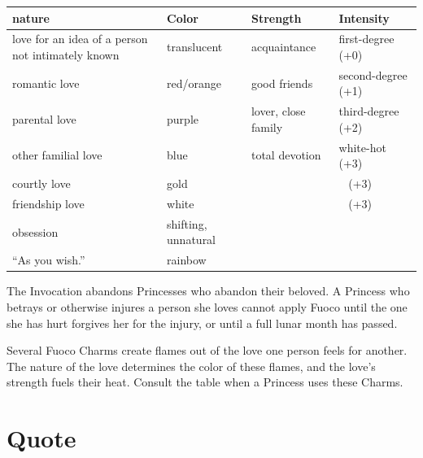 \begin{multicols}{2}
	\bigsidebarstart
	
    \centering \begin{tabulary}{1\textwidth}{|L|L|L|L|}
        \hline
        nature                                               & Color                & Strength             & Intensity        \\ \hline
        love for an idea of a person not intimately known  & translucent          & acquaintance         & first-degree (+0)  \\ \hline
        romantic love                                        & red/orange           & good friends         & second-degree (+1)  \\ \hline
        parental love                                        & purple                 & lover, close family  & third-degree (+2)  \\ \hline
        other familial love                                  & blue                & total devotion       & white-hot (+3)   \\ \hline
		courtly love                                         & gold                & ~                    & ~ (+3)   \\ \hline
		friendship love                                      & white                & ~                    & ~ (+3)   \\ \hline
        obsession                                            & shifting, unnatural  & ~                    & ~                \\ \hline
        \textquotedblleft As you wish.\textquotedblright\,      & rainbow              & ~                    & ~                \\
        \hline
    \end{tabulary}
	\bigsidebarend

The Invocation abandons Princesses who abandon their beloved. A Princess who betrays or otherwise injures a person she loves cannot apply Fuoco until the one she has hurt forgives her for the injury, or until a full lunar month has passed.

Several Fuoco Charms create flames out of the love one person feels for another. The nature of the love determines the color of these flames, and the love's strength fuels their heat. Consult the table when a Princess uses these Charms. 

\section*{Quote}


\end{multicols}
